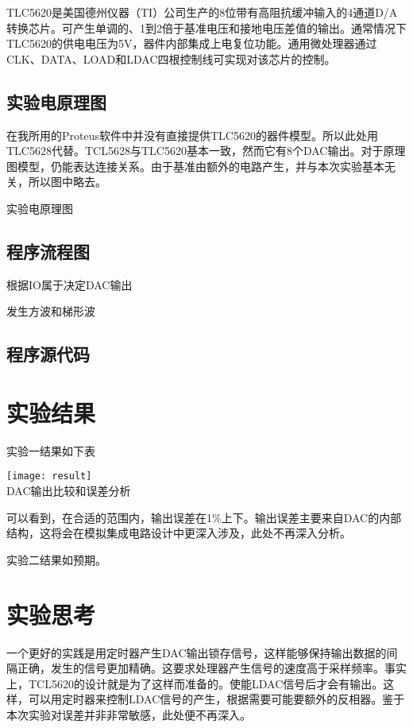 TLC5620是美国德州仪器（TI）公司生产的8位带有高阻抗缓冲输入的4通道D/A转换芯片。可产生单调的、1到2倍于基准电压和接地电压差值的输出。通常情况下TLC5620的供电电压为5V，器件内部集成上电复位功能。通用微处理器通过CLK、DATA、LOAD和LDAC四根控制线可实现对该芯片的控制。

\subsection{实验电原理图}

在我所用的Proteus软件中并没有直接提供TLC5620的器件模型。所以此处用TLC5628代替。TCL5628与TLC5620基本一致，然而它有8个DAC输出。对于原理图模型，仍能表达连接关系。由于基准由额外的电路产生，并与本次实验基本无关，所以图中略去。

\begin{center}
实验电原理图
\end{center}

\subsection{程序流程图}

\begin{center}
根据IO属于决定DAC输出
\end{center}

\begin{center}
发生方波和梯形波
\end{center}

\newpage

\subsection{程序源代码}



\section{实验结果}

实验一结果如下表

\begin{center}
\texttt{[image: result]}  \\
DAC输出比较和误差分析
\end{center}

可以看到，在合适的范围内，输出误差在1\%上下。输出误差主要来自DAC的内部结构，这将会在模拟集成电路设计中更深入涉及，此处不再深入分析。

实验二结果如预期。

\section{实验思考}
一个更好的实践是用定时器产生DAC输出锁存信号，这样能够保持输出数据的间隔正确，发生的信号更加精确。这要求处理器产生信号的速度高于采样频率。事实上，TCL5620的设计就是为了这样而准备的。使能LDAC信号后才会有输出。这样，可以用定时器来控制LDAC信号的产生，根据需要可能要额外的反相器。鉴于本次实验对误差并非非常敏感，此处便不再深入。



